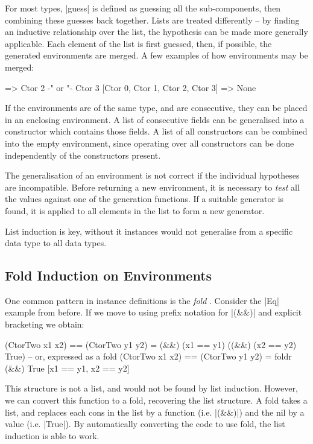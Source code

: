 \documentclass{llncs}
\begin{document}
For most types, |guess| is defined as guessing all the sub-components, then combining these guesses back together. Lists are treated differently -- by finding an inductive relationship over the list, the hypothesis can be made more generally applicable. Each element of the list is first guessed, then, if possible, the generated environments are merged. A few examples of how environments may be merged:

\begin{code}
                => Ctor 2 {-" \;\; or \;\; "-} Ctor 3
[Ctor 0, Ctor 1, Ctor 2, Ctor 3]  => None
\end{code}

If the environments are of the same type, and are consecutive, they can be placed in an enclosing environment. A list of consecutive fields can be generalised into a constructor which contains those fields. A list of all constructors can be combined into the empty environment, since operating over all constructors can be done independently of the constructors present.

The generalisation of an environment is not correct if the individual hypotheses are incompatible. Before returning a new environment, it is necessary to \textit{test} all the values against one of the generation functions. If a suitable generator is found, it is applied to all elements in the list to form a new generator.

List induction is key, without it instances would not generalise from a specific data type to all data types.

\subsection{Fold Induction on Environments}
\label{sec:fold}

One common pattern in instance definitions is the \textit{fold} \cite{hutton:fold}. Consider the |Eq| example from before. If we move to using prefix notation for |(&&)| and explicit bracketing we obtain:

\begin{code}
(CtorTwo x1 x2) == (CtorTwo y1 y2) = (&&) (x1 == y1) ((&&) (x2 == y2) True)
 -- or, expressed as a fold
(CtorTwo x1 x2) == (CtorTwo y1 y2) = foldr (&&) True [x1 == y1, x2 == y2]
\end{code}

This structure is not a list, and would not be found by list induction. However, we can convert this function to a fold, recovering the list structure. A fold takes a list, and replaces each cons in the list by a function (i.e. |(&&)|) and the nil by a value (i.e. |True|). By automatically converting the code to use fold, the list induction is able to work.
\end{document}
